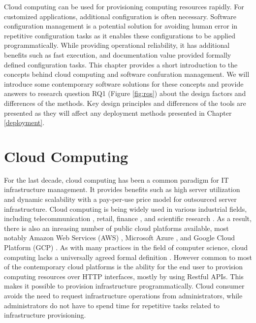 Cloud computing can be used for provisioning computing resources rapidly. For
customized applications, additional configuration is often necessary. Software
configuration management is a potential solution for avoiding human error in
repetitive configuration tasks as it enables these configurations to be applied
programmatically. While providing operational reliability, it has additional
benefits such as fast execution, and documentation value provided formally
defined configuration tasks. This chapter provides a short introduction to the
concepts behind cloud computing and software confuration management. We will
introduce some contemporary software solutions for these concepts and provide
answers to research question RQ1 (Figure \ref{fig:rqs}) about the design
factors and differences of the methods. Key design principles and differences
of the tools are presented as they will affect any deployment methods presented
in Chapter \ref{deployment}.

\section{Cloud Computing} \label{cloud-computing}

For the last decade, cloud computing has been a common paradigm for IT
infrastructure management. It provides benefits such as high server utilization
and dynamic scalability with a pay-per-use price model for outsourced server
infrastructure. Cloud computing is being widely used in various industrial
fields, including telecommunication \cite{china-mobile}, retail, finance
\cite{kanso2017enhancing}, and scientific research \cite{bell2015scaling}. As a
result, there is also an inreasing number of public cloud platforms available,
most notably Amazon Web Services (AWS) \citep{aws}, Microsoft Azure
\cite{azure}, and Google Cloud Platform (GCP) \cite{gcp}. As with many
practices in the field of computer science, cloud computing lacks a universally
agreed formal definition \cite{armbrust2010view}. However common to most of the
contemporary cloud platforms is the ability for the end user to provision
computing resources over HTTP interfaces, mostly by using Restful APIs. This
makes it possible to provision infrastructure programmatically. Cloud consumer
avoids the need to request infrastructure operations from administrators, while
administrators do not have to spend time for repetitive tasks related to
infrastructure provisioning.

